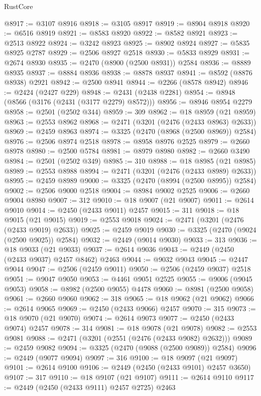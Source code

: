 \begin{lexlean}{RustCore}
\begin{coremodule}
@8917 := @3107 @8916
@8918 := @3105 @8917
@8919 := @8904 @8918
@8920 := @6516 @8919
@8921 := @8583 @8920
@8922 := @8582 @8921
@8923 := @2513 @8922
@8924 := @3242 @8923
@8925 := @8902 @8924
@8927 := @5835 @8925 @2787
@8929 := @2506 @8927 @2518
@8930 := @5833 @8929
@8931 := @2674 @8930
@8935 := @2470 (@8900 (@2500 @8931)) @2584
@8936 := @8889 @8935
@8937 := @8884 @8936
@8938 := @8878 @8937
@8941 := @8592 (@8876 @8938) @2921
@8942 := @2500 @8941
@8944 := @2266 (@8578 @8942)
@8946 := @2424 (@2427 @229)
@8948 := @2431 (@2438 @2281)
@8954 := @8948 (@8566 (@3176 (@2431 (@3177 @2279) @8572)))
@8956 := @8946 @8954 @2279
@8958 := @2501 (@2502 @344)
@8959 := 309
@8962 := @18 @8959 (@21 @8959)
@8963 := @2553 @8962
@8968 := @2471 (@3201 (@2476 (@2433 @8963) @2633))
@8969 := @2459 @8963
@8974 := @3325 (@2470 (@8968 (@2500 @8969)) @2584)
@8976 := @2506 @8974 @2518
@8978 := @8958 @8976 @2525
@8979 := @2660 @8978
@8980 := @2500 @5784
@8981 := @8979 @8980
@8982 := @2660 @3490
@8984 := @2501 (@2502 @349)
@8985 := 310
@8988 := @18 @8985 (@21 @8985)
@8989 := @2553 @8988
@8994 := @2471 (@3201 (@2476 (@2433 @8989) @2633))
@8995 := @2459 @8989
@9000 := @3325 (@2470 (@8994 (@2500 @8995)) @2584)
@9002 := @2506 @9000 @2518
@9004 := @8984 @9002 @2525
@9006 := @2660 @9004 @8980
@9007 := 312
@9010 := @18 @9007 (@21 @9007)
@9011 := @2614 @9010
@9014 := @2450 (@2433 @9011) @2457
@9015 := 311
@9018 := @18 @9015 (@21 @9015)
@9019 := @2553 @9018
@9024 := @2471 (@3201 (@2476 (@2433 @9019) @2633))
@9025 := @2459 @9019
@9030 := @3325 (@2470 (@9024 (@2500 @9025)) @2584)
@9032 := @2449 (@9014 @9030)
@9033 := 313
@9036 := @18 @9033 (@21 @9033)
@9037 := @2614 @9036
@9043 := @2449 (@2450 (@2433 @9037) @2457 @8462) @2463
@9044 := @9032 @9043
@9045 := @2447 @9044
@9047 := @2506 (@2459 @9011)
@9050 := @2506 (@2459 @9037) @2518
@9051 := @9047 @9050
@9053 := @4461 @9051 @2525
@9055 := @9006 (@9045 @9053)
@9058 := @8982 (@2500 @9055) @4478
@9060 := @8981 (@2500 @9058)
@9061 := @2660 @9060
@9062 := 318
@9065 := @18 @9062 (@21 @9062)
@9066 := @2614 @9065
@9069 := @2450 (@2433 @9066) @2457
@9070 := 315
@9073 := @18 @9070 (@21 @9070)
@9074 := @2614 @9073
@9077 := @2450 (@2433 @9074) @2457
@9078 := 314
@9081 := @18 @9078 (@21 @9078)
@9082 := @2553 @9081
@9088 := @2471 (@3201 (@2551 (@2476 (@2433 @9082) @2632)))
@9089 := @2459 @9082
@9094 := @3325 (@2470 (@9088 (@2500 @9089)) @2584)
@9096 := @2449 (@9077 @9094)
@9097 := 316
@9100 := @18 @9097 (@21 @9097)
@9101 := @2614 @9100
@9106 := @2449 (@2450 (@2433 @9101) @2457 @3650)
@9107 := 317
@9110 := @18 @9107 (@21 @9107)
@9111 := @2614 @9110
@9117 := @2449 (@2450 (@2433 @9111) @2457 @2725) @2463

\end{coremodule}
\end{lexlean}

